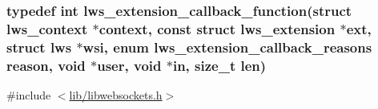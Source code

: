 \subsubsection[{\texorpdfstring{lws\+\_\+extension\+\_\+callback\+\_\+function}{lws\_extension\_callback\_function}}]{\setlength{\rightskip}{0pt plus 5cm}typedef int lws\+\_\+extension\+\_\+callback\+\_\+function(struct lws\+\_\+context $\ast$context, const struct {\bf lws\+\_\+extension} $\ast$ext, struct lws $\ast$wsi, enum lws\+\_\+extension\+\_\+callback\+\_\+reasons reason, void $\ast$user, void $\ast$in, size\+\_\+t len)}\hypertarget{group__extensions_gaae7169b2cd346b34fa33d0250db2afd0}{}\label{group__extensions_gaae7169b2cd346b34fa33d0250db2afd0}


{\ttfamily \#include $<$\hyperlink{libwebsockets_8h}{lib/libwebsockets.\+h}$>$}


